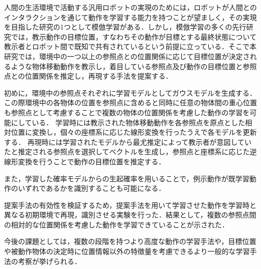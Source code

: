 ﻿人間の生活環境で活動する汎用ロボットの実現のためには，ロボットが人間とのインタラクションを通じて動作を学習する能力を持つことが望ましく，その実現を目指した研究の1つとして模倣学習がある．しかし，模倣学習の多くの先行研究では，教示動作の目標位置，すなわちその動作が目標とする最終状態について教示者とロボット間で既知で共有されているという前提に立っている．そこで本研究では，環境中の一つ以上の参照点との位置関係に応じて目標位置が決定されるような物体移動動作を教示し，着目している参照点及び動作の目標位置と参照点との位置関係を推定し，再現する手法を提案する．

初めに，環境中の参照点それぞれに学習モデルとしてガウスモデルを生成する．この際環境中の各物体の位置を参照点に含めると同時に任意の物体間の重心位置も参照点として考慮することで複数の物体の位置関係を考慮した動作の学習を可能にしている．
学習時には教示された物体移動動作を各参照点を原点とした相対位置に変換し，個々の座標系に応じた線形変換を行ったうえで各モデルを更新する．
再現時には学習されたモデルから最尤推定によって教示者が意図していたと推定される参照点を選択してベクトルを生成し，参照点と座標系に応じた逆線形変換を行うことで動作の目標位置を推定する．

また，学習した確率モデルからの生起確率を用いることで，例示動作が既学習動作のいずれであるかを識別することも可能になる．

提案手法の有効性を検証するため，提案手法を用いて学習させた動作を学習時と異なる初期環境で再現，識別させる実験を行った．結果として，複数の参照点間の相対的な位置関係を考慮した動作を学習できていることが示された．

今後の課題としては，複数の段階を持つより高度な動作の学習手法や，目標位置や被動作物体の決定時に位置情報以外の特徴量を考慮できるより一般的な学習手法の考察が挙げられる．